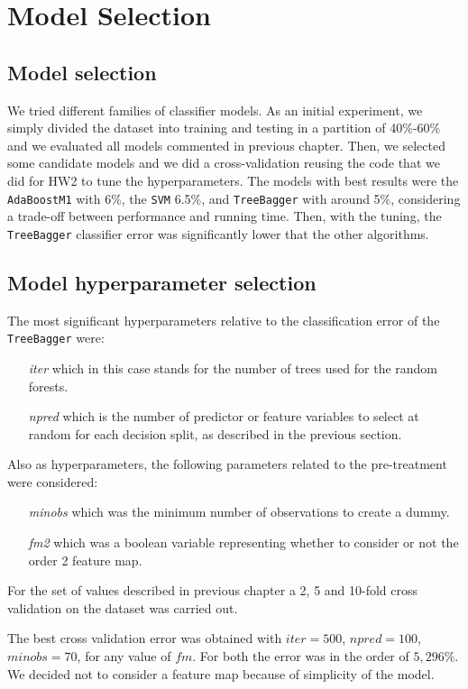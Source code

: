 \chapter{Model Selection}
\label{ch:ch4cv}

\section{Model selection}
We tried different families of classifier models. As an initial experiment, we simply divided the dataset into training and testing in a partition of 40\%-60\% and we evaluated all models commented in previous chapter. Then, we selected some candidate models and we did a cross-validation reusing the code that we did for HW2 to tune the hyperparameters. The models with best results were the \verb|AdaBoostM1| with 6\%, the \verb|SVM| 6.5\%, and \verb|TreeBagger| with around 5\%, considering a trade-off between performance and running time. Then, with the tuning, the \verb|TreeBagger| classifier error was significantly lower that the other algorithms.

\section{Model hyperparameter selection}
The most significant hyperparameters relative to the classification error of the \verb|TreeBagger| were: 
\begin{itemize}
    \item[\textit{iter}] which in this case stands for the number of trees used for the random forests.
    \item[\textit{npred}] which is the number of predictor or feature variables to select at random for each decision split, as described in the previous section.
\end{itemize}
Also as hyperparameters, the following parameters related to the pre-treatment were considered: 
\begin{itemize}
    \item[\textit{minobs}] which was the minimum number of observations to create a dummy.
    \item[\textit{fm2}] which was a boolean variable representing whether to consider or not the order 2 feature map.
\end{itemize}

For the set of values described in previous chapter a 2, 5 and 10-fold cross validation on the dataset was carried out.

The best cross validation error was obtained with $iter = 500$, $npred = 100$, $minobs=70$, for any value of $fm$. For both the error was in the order of $5,296\%$. We decided not to consider a feature map because of simplicity of the model. 


